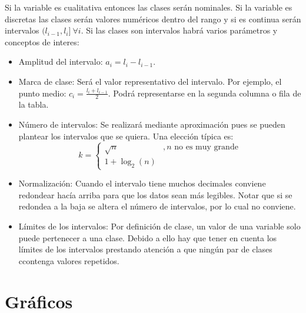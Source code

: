 \documentclass[10pt,a4paper]{book}
\begin{document}
Si la variable es cualitativa entonces las clases serán nominales. Si la variable es discretas las clases serán valores numéricos dentro del rango y si es continua serán intervalos $(l_{i-1},l_i]\:\forall i$. Si las clases son intervalos habrá varios parámetros y conceptos de interes: 
\begin{itemize}
	\item Amplitud del intervalo: $a_i = l_i -l_{i-1}$.
	\item Marca de clase: Será el valor representativo del intervalo. Por ejemplo, el punto medio: $c_i = \frac{l_i + l_{i-1}}{2}$. Podrá representarse en la segunda columna o fila de la tabla.
	\item Número de intervalos: Se realizará mediante aproximación pues se pueden plantear los intervalos que se quiera. Una elección típica es: 
		\[k = \begin{cases}
			\sqrt{n} & ,n \text{ no es muy grande}\\
			1+\log_2(n) 
		\end{cases}\]
	\item Normalización: Cuando el intervalo tiene muchos decimales conviene redondear hacía arriba para que los datos sean más legibles. Notar que si se redondea a la baja se altera el número de intervalos, por lo cual no conviene. 
	\item Límites de los intervalos: Por definición de clase, un valor de una variable solo puede pertenecer a una clase. Debido a ello hay que tener en cuenta los límites de los intervalos prestando atención a que ningún par de clases ccontenga valores repetidos.
\end{itemize}
\section{Gráficos}
\end{document}
